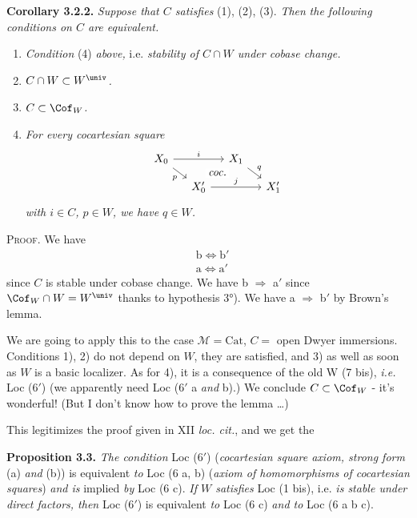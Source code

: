 \textbf{Corollary 3.2.2.} \textit{Suppose that $C$ satisfies} (1), (2), (3). \textit{Then}
\textit{the following conditions on $C$ are equivalent.}
\begin{enumerate}
\item[a)] \textit{Condition} (4) \textit{above,} i.e. \textit{stability of $C \cap W$ under cobase change.}
\item[a$'$)] \textit{$C \cap W \subset W^{\univ}$.}
\item[b)] \textit{$C \subset \Cof_W$.}
\item[b$'$)] \textit{For every cocartesian square}
\[
\begin{tikzcd}[ampersand replacement=\&, row sep=small, column sep=small]
X_0 \arrow[rr, "i"] \arrow[dr, "p"'] \arrow[to=2-4, phantom, "\textit{coc.}" description] \& \& X_1 \arrow[dr, "q"] \& \\
\& X'_0 \arrow[rr, "j"] \& \& X'_1
\end{tikzcd}
\]
\textit{with $i \in C$, $p \in W$, we have $q \in W$.}
\end{enumerate}
\textsc{Proof}. We have
\[
\begin{aligned}
&\text{b} \iff \text{b}'\\
&\text{a} \iff \text{a}'
\end{aligned}
\]
since $C$ is stable under cobase change. We have b $\Longrightarrow$ a$'$ since $\Cof_W \cap W = W^{\univ}$ thanks to hypothesis 3°). We have a $\Longrightarrow$ b$'$ by Brown's lemma.

We are going to apply this to the case $\mathcal{M} = \mathrm{Cat}$, $C =$ open Dwyer immersions. Conditions 1), 2) do not depend on $W$, they are satisfied, and 3) as well as soon as $W$ is a basic localizer. As for 4), it is a consequence of the old W (7 bis), \textit{i.e.} Loc (6$'$) (we
apparently need Loc (6$'$ a \textit{and} b).) We conclude $C \subset \Cof_W$ - it's wonderful! (But I don't know how to prove the lemma \dots)

This legitimizes the proof given in XII \textit{loc. cit.}, and we get the

\textbf{Proposition 3.3.} \textit{The condition} Loc (6$'$) (\textit{cocartesian square axiom, strong form} (a) \textit{and} (b)) is equivalent \textit{to} Loc (6 a, b) (\textit{axiom of homomorphisms of cocartesian squares}) \textit{and is} implied \textit{by} Loc (6 c). \textit{If $W$ satisfies} Loc (1 bis), i.e. \textit{is stable under direct factors, then} Loc (6$'$) is equivalent \textit{to} Loc (6 c) \textit{and to} Loc (6 a b c).

